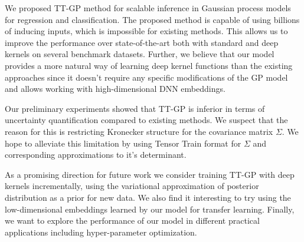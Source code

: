 We proposed TT-GP method for scalable inference in Gaussian process models
for regression and classification.  The proposed method is capable of using
billions of inducing inputs, which is impossible for existing methods. This allows us to improve the
performance over state-of-the-art both with standard and deep kernels
on several benchmark datasets.
Further, we believe that our model provides a more natural way of learning deep
kernel functions than the existing approaches since it doesn't require any
specific modifications of the GP model and allows working with high-dimensional
DNN embeddings.
 
Our preliminary experiments showed that TT-GP is inferior in terms of
uncertainty quantification compared to existing methods. We suspect that the
reason for this is restricting Kronecker structure for the covariance matrix $\Sigma$. 
We hope to alleviate this limitation by using Tensor Train format for $\Sigma$ 
and corresponding approximations to it's determinant.

As a promising direction for future work we consider training TT-GP
with deep kernels incrementally, using the variational approximation
of posterior distribution as a prior for new data. We also find it interesting
to try using the low-dimensional embeddings learned by our model for transfer learning. Finally, we want to
explore the performance of our model in different practical applications including hyper-parameter optimization.
